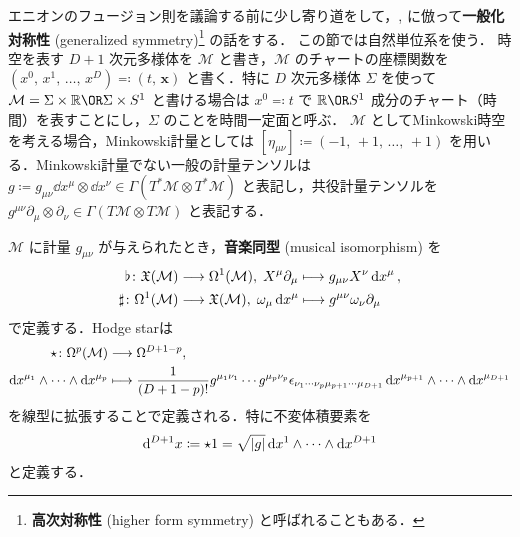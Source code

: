 \documentclass[TQFT_main]{subfiles}
\begin{document}
エニオンのフュージョン則を議論する前に少し寄り道をして，\cite{hidaka2022g-sym}, \cite{GaiottoKapustinSeibergWillett2015}に倣って\textbf{一般化対称性} (generalized symmetry)\footnote{\textbf{高次対称性} (higher form symmetry) と呼ばれることもある．} の話をする．
この節では自然単位系を使う．
時空を表す $D + 1$ 次元多様体を $\mathcal{M}$ と書き，$\mathcal{M}$ のチャートの座標関数を $(x^0,\, x^1,\, \dots,\, x^{D}) \eqqcolon (t,\, \bm{x})$ と書く．特に $D$ 次元多様体 $\Sigma$ を使って $\mathcal{M} = \Sigma \times \mathbb{R} \OR \Sigma \times S^1$ と書ける場合は $x^0 \eqqcolon t$ で $\mathbb{R} \OR S^1$ 成分のチャート（時間）を表すことにし，$\Sigma$ のことを時間一定面と呼ぶ．
$\mathcal{M}$ としてMinkowski時空を考える場合，Minkowski計量としては $[\eta_{\mu\nu}] \coloneqq (-1,\, +1,\, \dots,\, +1)$ を用いる．Minkowski計量でない一般の計量テンソルは $g \coloneqq g_{\mu\nu} \dd{x}^\mu \otimes \dd{x}^\nu \in \Gamma (T^*\mathcal{M} \otimes T^* \mathcal{M})$ と表記し，共役計量テンソルを $g^{\mu\nu} \partial_\mu \otimes \partial_\nu \in \Gamma(T \mathcal{M} \otimes T \mathcal{M})$ と表記する．

$\mathcal{M}$ に計量 $g_{\mu\nu}$ が与えられたとき，\textbf{音楽同型} (musical isomorphism) を
\begin{align}
    \flat \colon \mathfrak{X}(\mathcal{M}) &\longrightarrow \Omega^1(\mathcal{M}),\; X^\mu \partial_\mu \longmapsto g_{\mu\nu} X^\nu \dd{x^\mu}, \\
    \sharp \colon \Omega^1(\mathcal{M}) &\longrightarrow \mathfrak{X}(\mathcal{M}),\; \omega_\mu \dd{x^\mu} \longmapsto g^{\mu\nu} \omega_\nu \partial_\mu
\end{align}
で定義する．Hodge starは
\begin{align}
    \star \colon \Omega^p(\mathcal{M}) &\longrightarrow \Omega^{D+1-p},\\ 
    \dd{x^{\mu_1}} \wedge \cdots \wedge \dd{x^{\mu_p}} &\longmapsto \frac{1}{(D+1-p)!} g^{\mu_1 \nu_1} \cdots g^{\mu_p \nu_p} \epsilon_{\nu_1 \cdots \nu_p \mu_{p+1} \cdots \mu_{D+1}} \dd{x}^{\mu_{p+1}} \wedge \cdots \wedge \dd{x}^{\mu_{D+1}}
\end{align}
を線型に拡張することで定義される．特に不変体積要素を
\begin{align}
    \dd[D+1]{x} \coloneqq \star 1 = \sqrt{\abs{g}} \dd{x^1} \wedge \cdots \wedge \dd{x^{D+1}}
\end{align}
と定義する．
\end{document}
